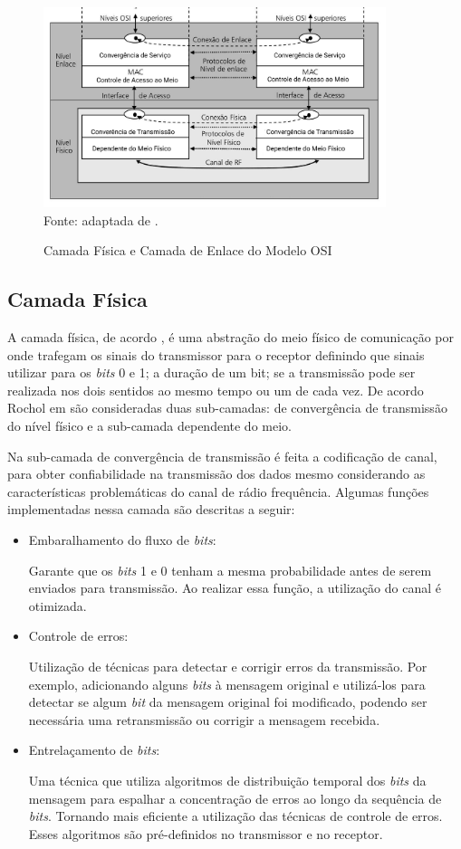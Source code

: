\begin{figure}[ht]
	\begin{center}
		\caption{Camada Física e Camada de Enlace do Modelo OSI}
		\includegraphics[width=10cm]{./sections/textual/chapters/images/modelo_osi_1e2.png}\\
		Fonte: adaptada de \cite{rochol2018sistemas}.
		\label{fig:modelo_osi_1e2}
	\end{center}
\end{figure}


\subsection{Camada Física}
A camada física, de acordo \cite{tanembaum2011}, é uma abstração do meio físico de comunicação por onde trafegam os sinais do transmissor para o receptor definindo que sinais utilizar para os \emph{bits} 0 e 1; a duração de um bit; se a transmissão pode ser realizada nos dois sentidos ao mesmo tempo ou um de cada vez. De acordo Rochol em \cite{rochol2018sistemas} são consideradas duas sub-camadas: de convergência de transmissão do nível físico e a sub-camada dependente do meio.

Na sub-camada de convergência de transmissão é feita a codificação de canal, para obter confiabilidade na transmissão dos dados mesmo considerando as características problemáticas do canal de rádio frequência. Algumas funções implementadas nessa camada são descritas a seguir:
\begin{itemize}
	\item Embaralhamento do fluxo de \emph{bits}:

	      Garante que os \emph{bits} 1 e 0 tenham a mesma probabilidade antes de serem enviados para transmissão. Ao realizar essa função, a utilização do canal é otimizada.
	\item Controle de erros:

	      Utilização de técnicas para detectar e corrigir erros da transmissão. Por exemplo, adicionando alguns \emph{bits} à mensagem original e utilizá-los para detectar se algum \emph{bit} da mensagem original foi modificado, podendo ser necessária uma retransmissão ou corrigir a mensagem recebida.
	\item Entrelaçamento de \emph{bits}:

	      Uma técnica que utiliza algoritmos de distribuição temporal dos \emph{bits} da mensagem para espalhar a concentração de erros ao longo da sequência de \emph{bits}. Tornando mais eficiente a utilização das técnicas de controle de erros. Esses algoritmos são pré-definidos no transmissor e no receptor.
\end{itemize}

